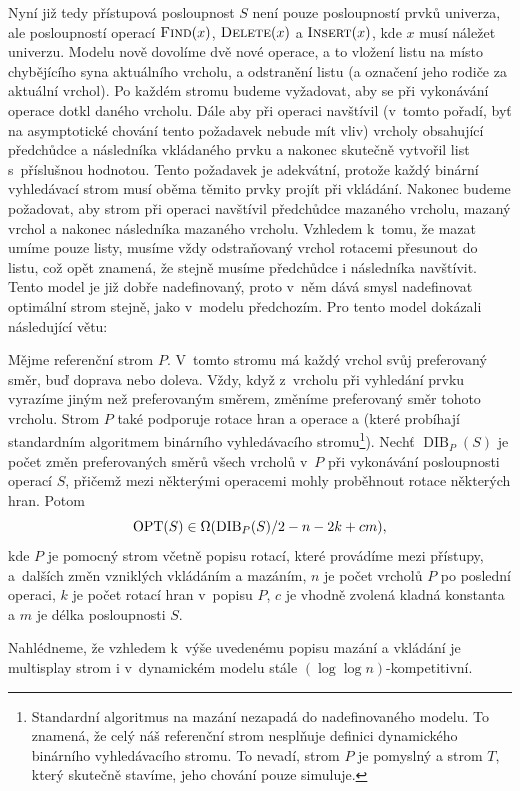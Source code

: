 Nyní již tedy přístupová posloupnost $S$ není pouze posloupností prvků
univerza, ale posloupností operací $\ope{Find}(x)$, $\ope{Delete}(x)$ a
$\ope{Insert}(x)$, kde $x$ musí náležet univerzu. Modelu nově dovolíme dvě
nové operace, a to vložení listu na místo chybějícího syna aktuálního vrcholu,
a odstranění listu (a označení jeho rodiče za aktuální vrchol). Po každém
stromu budeme vyžadovat, aby se při vykonávání operace  dotkl daného
vrcholu. Dále aby při operaci  navštívil (v~tomto pořadí, byť na
asymptotické chování tento požadavek nebude mít vliv) vrcholy obsahující
předchůdce a následníka vkládaného prvku a nakonec skutečně vytvořil list
s~příslušnou hodnotou. Tento požadavek je adekvátní, protože každý binární
vyhledávací strom musí oběma těmito prvky projít při vkládání. Nakonec budeme
požadovat, aby strom při operaci  navštívil předchůdce mazaného
vrcholu, mazaný vrchol a nakonec následníka mazaného vrcholu. Vzhledem k~tomu,
že mazat umíme pouze listy, musíme vždy odstraňovaný vrchol rotacemi přesunout
do listu, což opět znamená, že stejně musíme předchůdce i následníka navštívit.
Tento model je již dobře nadefinovaný, proto v~něm dává smysl nadefinovat optimální strom stejně, jako v~modelu předchozím.
Pro tento model \citet{multisplay} dokázali následující větu:

\begin{veta}
\def\dib{\operatorname{DIB}}
Mějme referenční strom $P$. V~tomto stromu má každý vrchol svůj preferovaný
směr, buď doprava nebo doleva. Vždy, když z~vrcholu při vyhledání prvku vyrazíme
jiným než preferovaným směrem, změníme preferovaný směr tohoto vrcholu. Strom
$P$ také podporuje rotace hran a operace  a  (které
probíhají standardním algoritmem binárního vyhledávacího stromu\footnote{Standardní algoritmus na mazání nezapadá do nadefinovaného modelu. To
znamená, že celý náš referenční strom nesplňuje definici dynamického
binárního vyhledávacího stromu. To nevadí, strom $P$ je pomyslný a strom
$T$, který skutečně stavíme, jeho chování pouze simuluje.}). Nechť $\dib_P(S)$ je
počet změn preferovaných směrů všech vrcholů v~$P$ při vykonávání posloupnosti
operací $S$, přičemž mezi některými operacemi mohly proběhnout rotace některých
hran. Potom $$\opt(S) \in \Omega(\dib_P(S)/2 - n - 2k + cm),$$ kde $P$ je
pomocný strom včetně popisu rotací, které provádíme mezi přístupy, a~dalších
změn vzniklých vkládáním a mazáním, $n$ je počet vrcholů $P$ po poslední operaci, $k$
je počet rotací hran v~popisu $P$, $c$ je vhodně zvolená kladná konstanta a $m$
je délka posloupnosti $S$.  \end{veta}

Nahlédneme, že vzhledem k~výše uvedenému popisu mazání a vkládání je multisplay strom i v~dynamickém modelu stále $(\log\log n)$-kompetitivní. 


